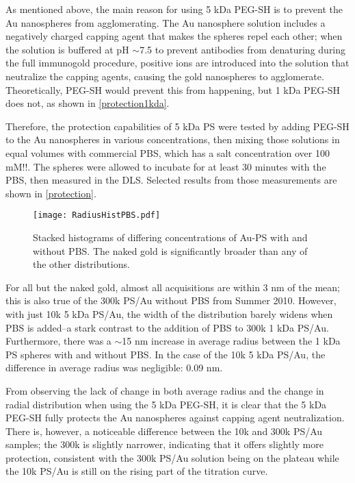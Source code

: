 As mentioned above, the main reason for using 5 kDa PEG-SH is to prevent the Au nanospheres from agglomerating. The Au nanosphere solution includes a negatively charged capping agent that makes the spheres repel each other; when the solution is buffered at pH \ensuremath{\sim}7.5 to prevent antibodies from denaturing during the full immunogold procedure, positive ions are introduced into the solution that neutralize the capping agents, causing the gold nanospheres to agglomerate. Theoretically, PEG-SH would prevent this from happening, but 1 kDa PEG-SH does not, as shown in \autoref{protection1kda}.

Therefore, the protection capabilities of 5 kDa PS were tested by adding PEG-SH to the Au nanospheres in various concentrations, then mixing those solutions in equal volumes with commercial PBS, which has a salt concentration over 100 mM!!. The spheres were allowed to incubate for at least 30 minutes with the PBS, then measured in the DLS. Selected results from those measurements are shown in \autoref{protection}.

\begin{figure}[htbp]
\centering
\texttt{[image: RadiusHistPBS.pdf]}
\caption{Stacked histograms of differing concentrations of Au-PS with and without PBS. The naked gold is significantly broader than any of the other distributions.}
\label{protection}
\end{figure}



For all but the naked gold, almost all acquisitions are within 3 nm of the mean; this is also true of the 300k PS\slash Au without PBS from Summer 2010. However, with just 10k 5 kDa PS\slash Au, the width of the distribution barely widens when PBS is added--a stark contrast to the addition of PBS to 300k 1 kDa PS\slash Au. Furthermore, there was a \ensuremath{\sim}15 nm increase in average radius between the 1 kDa PS spheres with and without PBS. In the case of the 10k 5 kDa PS\slash Au, the difference in average radius was negligible: 0.09 nm.

From observing the lack of change in both average radius and the change in radial distribution when using the 5 kDa PEG-SH, it is clear that the 5 kDa PEG-SH fully protects the Au nanospheres against capping agent neutralization. There is, however, a noticeable difference between the 10k and 300k PS\slash Au samples; the 300k is slightly narrower, indicating that it offers slightly more protection, consistent with the 300k PS\slash Au solution being on the plateau while the 10k PS\slash Au is still on the rising part of the titration curve.
